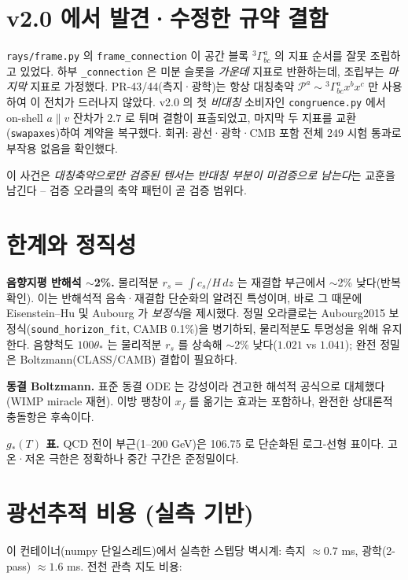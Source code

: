 \documentclass[11pt]{article}
\begin{document}
\section{v2.0 에서 발견·수정한 규약 결함}

\texttt{rays/frame.py} 의 \texttt{frame\_connection} 이 공간 블록 ${}^3\Gamma^a_{bc}$ 의
지표 순서를 잘못 조립하고 있었다. 하부 \texttt{\_connection} 은 미분 슬롯을 \emph{가운데}
지표로 반환하는데, 조립부는 \emph{마지막} 지표로 가정했다. PR-43/44(측지·광학)는 항상
대칭축약 $\mathcal{P}^a\sim{}^3\Gamma^a_{bc}x^bx^c$ 만 사용하여 이 전치가 드러나지 않았다.
v2.0 의 첫 \emph{비대칭} 소비자인 \texttt{congruence.py} 에서 on-shell $a\parallel v$ 잔차가
$2.7$ 로 튀며 결함이 표출되었고, 마지막 두 지표를 교환(\texttt{swapaxes})하여 계약을
복구했다. 회귀: 광선·광학·CMB 포함 전체 249 시험 통과로 부작용 없음을 확인했다.

이 사건은 \emph{대칭축약으로만 검증된 텐서는 반대칭 부분이 미검증으로 남는다}는 교훈을
남긴다 -- 검증 오라클의 축약 패턴이 곧 검증 범위다.

\section{한계와 정직성}

\textbf{음향지평 반해석 $\sim$2\%.} 물리적분 $r_s=\int c_s/H\,dz$ 는 재결합 부근에서
$\sim$2\% 낮다(반복 확인). 이는 반해석적 음속·재결합 단순화의 알려진 특성이며, 바로
그 때문에 Eisenstein--Hu 및 Aubourg 가 \emph{보정식}을 제시했다. 정밀 오라클로는
Aubourg2015 보정식(\texttt{sound\_horizon\_fit}, CAMB 0.1\%)을 병기하되, 물리적분도
투명성을 위해 유지한다. 음향척도 $100\theta_*$ 는 물리적분 $r_s$ 를 상속해 $\sim$2\%
낮다($1.021$ vs $1.041$); 완전 정밀은 Boltzmann(CLASS/CAMB) 결합이 필요하다.

\textbf{동결 Boltzmann.} 표준 동결 ODE 는 강성이라 견고한 해석적 공식으로 대체했다
(WIMP miracle 재현). 이방 팽창이 $x_f$ 를 옮기는 효과는 포함하나, 완전한 상대론적
충돌항은 후속이다.

\textbf{$g_*(T)$ 표.} QCD 전이 부근(1--200 GeV)은 106.75 로 단순화된 로그-선형 표이다.
고온·저온 극한은 정확하나 중간 구간은 준정밀이다.

\section{광선추적 비용 (실측 기반)}

이 컨테이너(numpy 단일스레드)에서 실측한 스텝당 벽시계: 측지 $\approx0.7$ ms,
광학(2-pass) $\approx1.6$ ms. 전천 관측 지도 비용:
\end{document}
